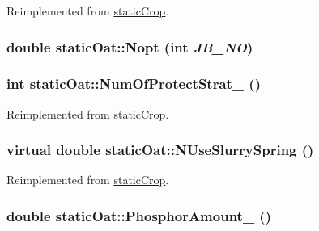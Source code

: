 Reimplemented from \hyperlink{classstatic_crop_a32b69ed138beaed150efa74d18e82d8e}{staticCrop}.\hypertarget{classstatic_oat_a070016c89c425653b34ae9bb6cc55739}{
\subsubsection[{Nopt}]{\setlength{\rightskip}{0pt plus 5cm}double staticOat::Nopt (int {\em JB\_\-NO})}}
\label{classstatic_oat_a070016c89c425653b34ae9bb6cc55739}
\hypertarget{classstatic_oat_a4f743cca9e48390571d709c2f8fbbb31}{
\subsubsection[{NumOfProtectStrat\_\-}]{\setlength{\rightskip}{0pt plus 5cm}int staticOat::NumOfProtectStrat\_\- ()}}
\label{classstatic_oat_a4f743cca9e48390571d709c2f8fbbb31}


Reimplemented from \hyperlink{classstatic_crop_a4d3d767f569f48eb68ffa76822302467}{staticCrop}.\hypertarget{classstatic_oat_a85e86ff37c0620aaa290f77a7599271d}{
\subsubsection[{NUseSlurrySpring}]{\setlength{\rightskip}{0pt plus 5cm}virtual double staticOat::NUseSlurrySpring ()}}
\label{classstatic_oat_a85e86ff37c0620aaa290f77a7599271d}


Reimplemented from \hyperlink{classstatic_crop_ae7d21ab4afc8d8355d231566e8d87b1b}{staticCrop}.\hypertarget{classstatic_oat_a2cc3d18305c05a76da8163e80ced73b8}{
\subsubsection[{PhosphorAmount\_\-}]{\setlength{\rightskip}{0pt plus 5cm}double staticOat::PhosphorAmount\_\- ()}}
\label{classstatic_oat_a2cc3d18305c05a76da8163e80ced73b8}


